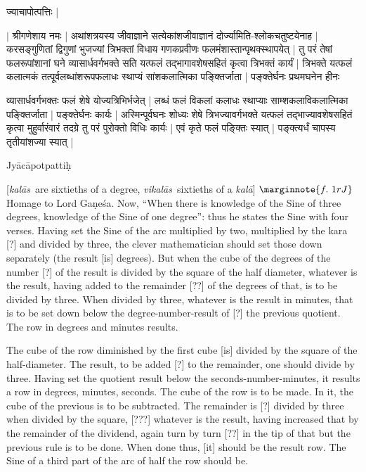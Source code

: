 \documentclass[12pt]{book}
\let\*=\d
\def\Ganesa{Ga\-\*ne\-\'sa}
\def\kala{\textit{ka\-l\=a}}
\def\kalas{\textit{ka\-l\=as}}
\def\vikalas{\textit{vi\-ka\-l\=as}}
\begin{document}
\begin{center}
{\s ज्याचापोत्पत्तिः |} \\
\end{center}
\bigskip

{\s $|$  श्रीगणेशाय नमः |
अथांशत्रयस्य जीवाज्ञाने सत्येकांशजीवाज्ञानं
दोर्ज्यामिति-श्लोकचतुष्टयेनाह |
करसङ्गुणितां द्विगुणां भुजज्यां
त्रिभक्तां विधाय
गणकप्रवीणः फलमंशास्तान्पृथक्स्थापयेत् |
तु परं तेषां फलरूपांशानां घने व्यासार्धवर्गभक्ते सति
यत्फलं तद्भागावशेषसहितं कृत्वा त्रिभक्तं कार्यं |
त्रिभक्ते यत्फलं कलात्मकं तत्पूर्वलब्धांशरूपफलाधः स्थाप्यं सांशकलात्मिका पङ्क्तिर्जाता |
पङ्क्तेर्घनः प्रथमघनेन हीनः 

व्यासार्धवर्गभक्तः फलं शेषे योज्यत्रिभिर्भजेत् |
लब्धं फलं विकलां कलाधः स्थाप्याः साम्शकलाविकलात्मिका
पङ्क्तिर्जाता |
पङ्क्तेर्घनः कार्यः | 
अस्मिन्पूर्वघनः शोध्यः शेषे त्रिभज्यावर्गभक्ते यत्फलं तद्भाज्यावशेषसहितं
कृत्वा मुहुर्वारंवारं तदग्रे तु परं पुरोक्तो विधिः कार्यः | एवं कृते फलं पङ्क्तिः स्यात् |
पङ्क्त्यर्धं चापस्य तृतीयांशज्या स्यात् | }

\newpage


\begin{center}
{Jyācāpotpattiḥ}
\end{center}

[\kalas\ are sixtieths of a degree, \vikalas\ sixtieths of a \kala]
\medskip
{}
$\marginnote{f.~1r J}$Homage to Lord \Ganesa. Now, ``When there is knowledge of the Sine of three degrees,
knowledge of the Sine of one degree'': thus he states the Sine with four verses.
Having set the Sine of the arc multiplied by two, multiplied by the kara [?] and divided by three, the 
clever mathematician should set those down separately (the result [is] degrees). 
But when the cube of the degrees of the number [?] of the result is divided
by the square of the half diameter, whatever is the result, having added to the 
remainder [??] of the degrees of that, is to be divided by three. When divided by
three, whatever is the result in minutes, that is to be set down below the degree-number-result
of [?] the previous quotient. The row in degrees and minutes results. 

The cube of the row diminished by the first cube [is] divided by the square of the 
half-diameter. The result, to be added [?] to the remainder, one should divide by three.
Having set the quotient  result below the seconds-number-minutes, it results a row 
in degrees, minutes, seconds.  The cube of the row is to be made. In it, the cube of
the previous is to be subtracted. The remainder is [?] divided by three when divided
by the square, [???] whatever is the result, having increased that by the remainder
of the dividend, again turn by turn [??] in the tip of that but the previous rule is to be 
done. When done thus, [it] should be the result row.  The Sine of a third part of the 
arc  of half the row should be.
\end{document}
